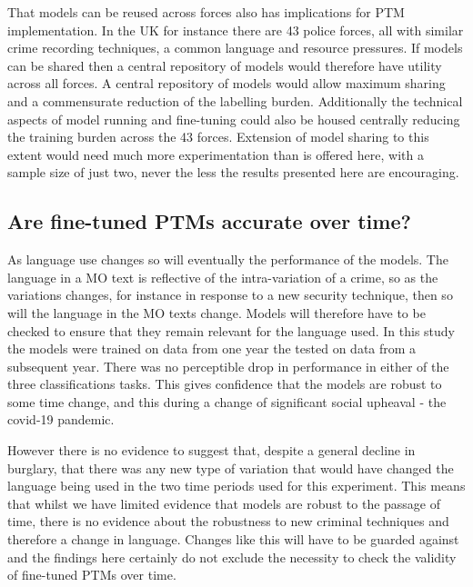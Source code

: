 That models can be reused across forces also has implications for PTM implementation. In the UK for instance there are 43 police forces, all with similar crime recording techniques, a common language and resource pressures. If models can be shared then a central repository of models would therefore have utility across all forces. A central repository of models would allow maximum sharing and a commensurate reduction of the labelling burden. Additionally the technical aspects of model running and fine-tuning could also be housed centrally reducing the training burden across the 43 forces. Extension of model sharing to this extent would need much more experimentation than is offered here, with a sample size of just two, never the less the results presented here are encouraging.


\subsection{Are fine-tuned PTMs accurate over time?} As language use changes so will eventually the performance of the models. The language in a MO text is reflective of the intra-variation of a crime, so as the variations changes, for instance in response to a new security technique, then so will the language in the MO texts change. Models will therefore have to be checked to ensure that they remain relevant for the language used. In this study the models were trained on data from one year the tested on data from a subsequent year. There was no perceptible drop in performance in either of the three classifications tasks. This gives confidence that the models are robust to some time change, and this during a change of significant social upheaval - the covid-19 pandemic. 

However there is no evidence to suggest that, despite a general decline in burglary, that there was any new type of variation that would have changed the language being used in the two time periods used for this experiment. This means that whilst we have limited evidence that models are robust to the passage of time, there is no evidence about the robustness to new criminal techniques and therefore a change in language. Changes like this will have to be guarded against and the findings here certainly do not exclude the necessity to check the validity of fine-tuned PTMs over time.


